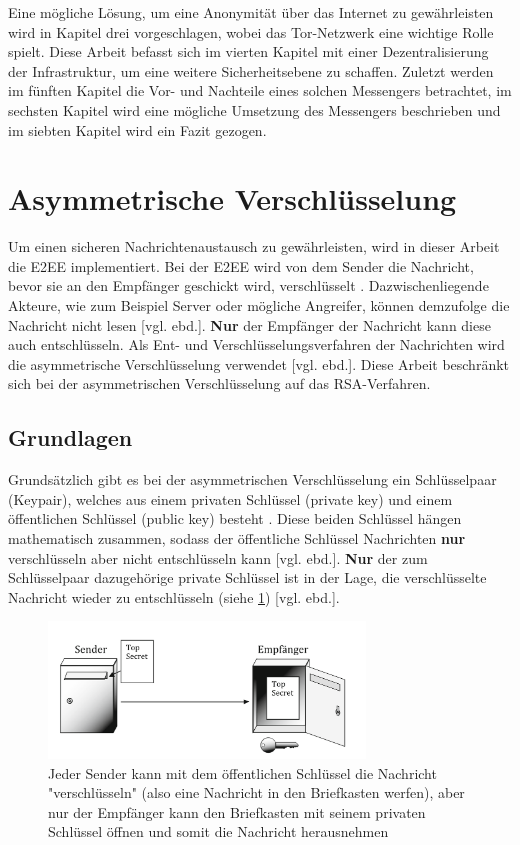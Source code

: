 \documentclass[a4paper,ngerman, headheight=28pt,12pt]{scrartcl}
\newcommand{\vcite}[1]{\cite[vgl.][]{#1}}
\newcommand{\vebd}{[vgl. ebd.]}
\begin{document}
Eine mögliche Lösung, um eine Anonymität über das Internet zu gewährleisten wird in Kapitel drei vorgeschlagen, wobei das Tor-Netzwerk eine wichtige Rolle spielt.
Diese Arbeit befasst sich im vierten Kapitel mit einer Dezentralisierung der Infrastruktur, um eine weitere Sicherheitsebene zu schaffen.
Zuletzt werden im fünften Kapitel die Vor- und Nachteile eines solchen Messengers betrachtet, im sechsten Kapitel wird eine mögliche Umsetzung des Messengers beschrieben und im siebten Kapitel wird ein Fazit gezogen.


\section{Asymmetrische Verschlüsselung}
Um einen sicheren Nachrichtenaustausch zu gewährleisten, wird in dieser Arbeit die E2EE implementiert. Bei der E2EE wird von dem Sender die Nachricht, bevor sie an den Empfänger geschickt wird, verschlüsselt \vcite{E2EE}. Dazwischenliegende Akteure, wie zum Beispiel Server oder mögliche Angreifer, können demzufolge die Nachricht nicht lesen \vebd. \textbf{Nur} der Empfänger der Nachricht kann diese auch entschlüsseln. Als Ent- und Verschlüsselungsverfahren der Nachrichten wird die asymmetrische Verschlüsselung verwendet \vebd. Diese Arbeit beschränkt sich bei der asymmetrischen Verschlüsselung auf das RSA-Verfahren.
\subsection{Grundlagen}
Grundsätzlich gibt es bei der asymmetrischen Verschlüsselung ein Schlüsselpaar (Keypair), welches aus einem privaten Schlüssel (private key) und einem öffentlichen Schlüssel (public key) besteht \vcite{Rsa-Basics}. Diese beiden Schlüssel hängen mathematisch zusammen, sodass der öffentliche Schlüssel Nachrichten \textbf{nur} verschlüsseln aber nicht entschlüsseln kann \vebd. \textbf{Nur} der zum Schlüsselpaar dazugehörige private Schlüssel ist in der Lage, die verschlüsselte Nachricht wieder zu entschlüsseln (siehe \cref{fig:E2EE}) \vebd.

\begin{figure}[h]
  \centering
  \includegraphics[width=0.75\textwidth]{Briefkasten-asymm.png}
  \caption{Jeder Sender kann mit dem öffentlichen Schlüssel die Nachricht "verschlüsseln" (also eine Nachricht in den Briefkasten werfen), aber nur der Empfänger kann den Briefkasten mit seinem privaten Schlüssel öffnen und somit die Nachricht herausnehmen\vcite{fig:Rsa-Cryptography} \label{fig:E2EE}}
\end{figure}
\end{document}
